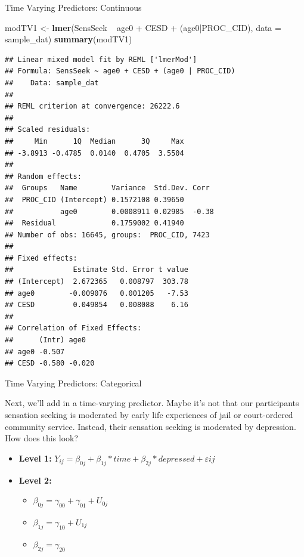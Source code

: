 \documentclass[ignorenonframetext,]{beamer}
\newenvironment{Shaded}{\begin{snugshade}}{\end{snugshade}}
\newcommand{\KeywordTok}[1]{\textcolor[rgb]{0.13,0.29,0.53}{\textbf{{#1}}}}
\newcommand{\DataTypeTok}[1]{\textcolor[rgb]{0.13,0.29,0.53}{{#1}}}
\newcommand{\StringTok}[1]{\textcolor[rgb]{0.31,0.60,0.02}{{#1}}}
\newcommand{\NormalTok}[1]{{#1}}
\begin{document}
\begin{frame}[fragile]{Time Varying Predictors: Continuous}

\small

\begin{Shaded}
\begin{Highlighting}[]
\NormalTok{modTV1 <-}\StringTok{ }\KeywordTok{lmer}\NormalTok{(SensSeek ~}\StringTok{ }\NormalTok{age0 +}\StringTok{ }\NormalTok{CESD +}\StringTok{ }\NormalTok{(age0|PROC_CID), }\DataTypeTok{data =} \NormalTok{sample_dat)}
\KeywordTok{summary}\NormalTok{(modTV1)}
\end{Highlighting}
\end{Shaded}

\tiny

\begin{verbatim}
## Linear mixed model fit by REML ['lmerMod']
## Formula: SensSeek ~ age0 + CESD + (age0 | PROC_CID)
##    Data: sample_dat
## 
## REML criterion at convergence: 26222.6
## 
## Scaled residuals: 
##     Min      1Q  Median      3Q     Max 
## -3.8913 -0.4785  0.0140  0.4705  3.5504 
## 
## Random effects:
##  Groups   Name        Variance  Std.Dev. Corr 
##  PROC_CID (Intercept) 0.1572108 0.39650       
##           age0        0.0008911 0.02985  -0.38
##  Residual             0.1759002 0.41940       
## Number of obs: 16645, groups:  PROC_CID, 7423
## 
## Fixed effects:
##              Estimate Std. Error t value
## (Intercept)  2.672365   0.008797  303.78
## age0        -0.009076   0.001205   -7.53
## CESD         0.049854   0.008088    6.16
## 
## Correlation of Fixed Effects:
##      (Intr) age0  
## age0 -0.507       
## CESD -0.580 -0.020
\end{verbatim}

\normalsize

\end{frame}

\begin{frame}{Time Varying Predictors: Categorical}

Next, we'll add in a time-varying predictor. Maybe it's not that our
participants sensation seeking is moderated by early life experiences of
jail or court-ordered community service. Instead, their sensation
seeking is moderated by depression.\\
How does this look?

\begin{itemize}
  \item \textbf{Level 1:} $Y_{ij} = \beta_{0j} + \beta_{1j}*time + \beta_{2j}*depressed + \varepsilon{ij}$
  \item \textbf{Level 2:} 
    \begin{itemize} 
      \item $\beta_{0j} = \gamma_{00} + \gamma_{01} + U_{0j}$
      \item $\beta_{1j} = \gamma_{10} + U_{1j}$
      \item $\beta_{2j} = \gamma_{20}$
    \end{itemize}
\end{itemize}

\end{frame}
\end{document}
